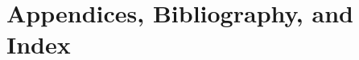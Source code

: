 \documentclass[letterpaper,10pt,titlepage]{custbook}
\begin{document}
%

%

%

%

%


%

%


%


%

\part{Appendices, Bibliography, and Index}

\appendix

%
%
%
%
%
%
%
\end{document}
